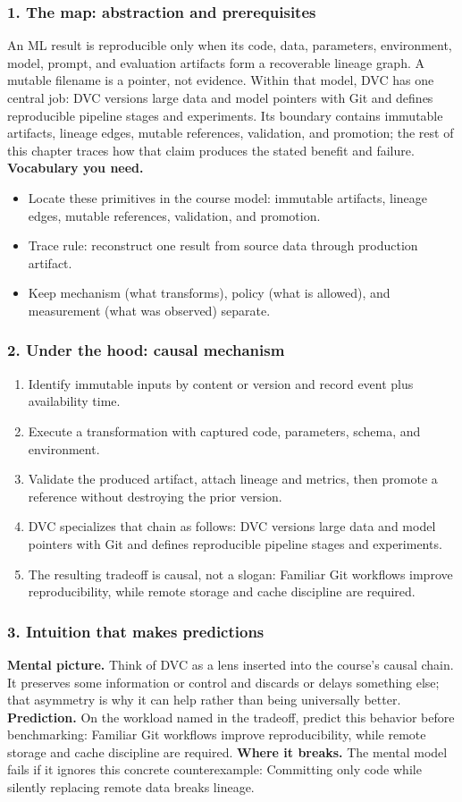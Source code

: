 \subsubsection*{1. The map: abstraction and prerequisites}
An ML result is reproducible only when its code, data, parameters, environment, model, prompt, and evaluation artifacts form a recoverable lineage graph. A mutable filename is a pointer, not evidence.
Within that model, DVC has one central job: DVC versions large data and model pointers with Git and defines reproducible pipeline stages and experiments. Its boundary contains immutable artifacts, lineage edges, mutable references, validation, and promotion; the rest of this chapter traces how that claim produces the stated benefit and failure.
\textbf{Vocabulary you need.}\begin{itemize}
\item Locate these primitives in the course model: immutable artifacts, lineage edges, mutable references, validation, and promotion.
\item Trace rule: reconstruct one result from source data through production artifact.
\item Keep mechanism (what transforms), policy (what is allowed), and measurement (what was observed) separate.
\end{itemize}
\subsubsection*{2. Under the hood: causal mechanism}\begin{enumerate}
\item Identify immutable inputs by content or version and record event plus availability time.
\item Execute a transformation with captured code, parameters, schema, and environment.
\item Validate the produced artifact, attach lineage and metrics, then promote a reference without destroying the prior version.
\item DVC specializes that chain as follows: DVC versions large data and model pointers with Git and defines reproducible pipeline stages and experiments.
\item The resulting tradeoff is causal, not a slogan: Familiar Git workflows improve reproducibility, while remote storage and cache discipline are required.
\end{enumerate}
\subsubsection*{3. Intuition that makes predictions}
\textbf{Mental picture.} Think of DVC as a lens inserted into the course's causal chain. It preserves some information or control and discards or delays something else; that asymmetry is why it can help rather than being universally better.
\textbf{Prediction.} On the workload named in the tradeoff, predict this behavior before benchmarking: Familiar Git workflows improve reproducibility, while remote storage and cache discipline are required.
\textbf{Where it breaks.} The mental model fails if it ignores this concrete counterexample: Committing only code while silently replacing remote data breaks lineage.
